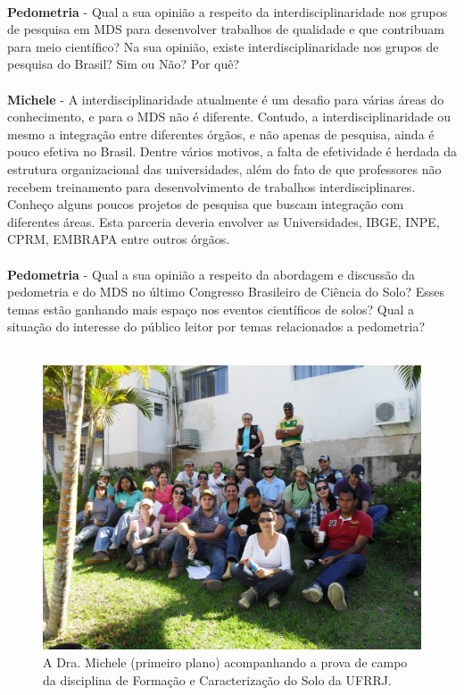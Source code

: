 \\
\textbf{Pedometria} - Qual a sua opinião a respeito da interdisciplinaridade nos grupos de pesquisa em MDS para desenvolver trabalhos de qualidade e que contribuam para meio científico? Na sua opinião, existe interdisciplinaridade nos grupos de pesquisa do Brasil? Sim ou Não? Por quê?\\
\\
\textbf{Michele} - A interdisciplinaridade atualmente é um desafio para várias áreas do conhecimento, e para o MDS não é diferente. Contudo, a interdisciplinaridade ou mesmo a integração entre diferentes órgãos, e não apenas de pesquisa, ainda é pouco efetiva no Brasil. Dentre vários motivos, a falta de efetividade é herdada da estrutura organizacional das universidades, além do fato de que professores não recebem treinamento para desenvolvimento de trabalhos interdisciplinares. Conheço alguns poucos projetos de pesquisa que buscam integração com diferentes áreas. Esta parceria deveria envolver as Universidades, IBGE, INPE, CPRM, EMBRAPA entre outros órgãos.\\
\\
\textbf{Pedometria} - Qual a sua opinião a respeito da abordagem e discussão da pedometria e do MDS no último Congresso Brasileiro de Ciência do Solo? Esses temas estão ganhando mais espaço nos eventos científicos de solos? Qual a situação do interesse do público leitor por temas relacionados a pedometria?\\
\\
\begin{figure}[htbp]
\centering
\includegraphics[scale=0.8]{figuras/michele-viagem}
\caption{A Dra. Michele (primeiro plano) acompanhando a prova de campo da disciplina de Formação e Caracterização do Solo da UFRRJ.}
\label{figure:covar}
\end{figure}
